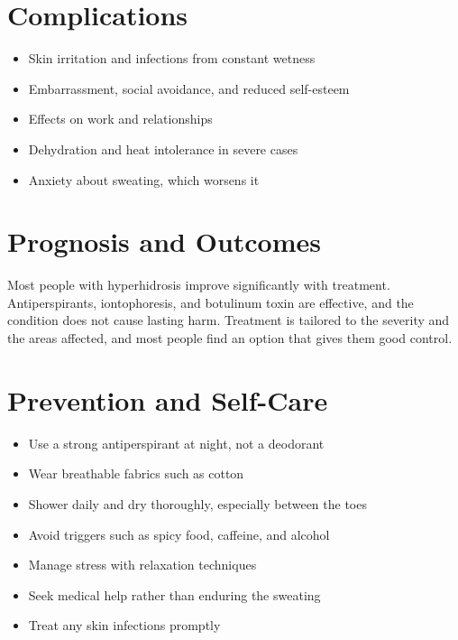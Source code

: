 \section*{Complications}
\begin{itemize}
    \item Skin irritation and infections from constant wetness
    \item Embarrassment, social avoidance, and reduced self-esteem
    \item Effects on work and relationships
    \item Dehydration and heat intolerance in severe cases
    \item Anxiety about sweating, which worsens it
\end{itemize}

\section*{Prognosis and Outcomes}
Most people with hyperhidrosis improve significantly with treatment. Antiperspirants, iontophoresis, and botulinum toxin are effective, and the condition does not cause lasting harm. Treatment is tailored to the severity and the areas affected, and most people find an option that gives them good control.

\section*{Prevention and Self-Care}
\begin{itemize}
    \item Use a strong antiperspirant at night, not a deodorant
    \item Wear breathable fabrics such as cotton
    \item Shower daily and dry thoroughly, especially between the toes
    \item Avoid triggers such as spicy food, caffeine, and alcohol
    \item Manage stress with relaxation techniques
    \item Seek medical help rather than enduring the sweating
    \item Treat any skin infections promptly
\end{itemize}

